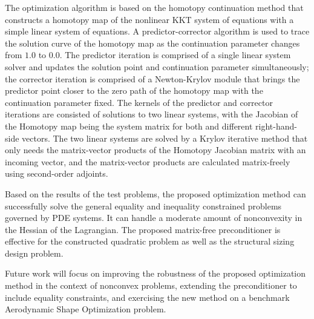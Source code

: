 \documentclass{article}
\theoremstyle{definition}
\begin{document}
The optimization algorithm is based on the homotopy continuation method that constructs a homotopy map of the nonlinear KKT system of equations with a simple linear system of equations. A predictor-corrector algorithm is used to trace the solution curve of the homotopy map as the continuation parameter changes from $1.0$ to $0.0$. The predictor iteration is comprised of a single linear system solver and updates the solution point and continuation parameter simultaneously; the corrector iteration is comprised of a Newton-Krylov module that brings the predictor point closer to the zero path of the homotopy map with the continuation parameter fixed. The kernels of the predictor and corrector iterations are consisted of solutions to two linear systems, with the Jacobian of the Homotopy map being the system matrix for both and different right-hand-side vectors. The two linear systems are solved by a Krylov iterative method that only needs the matrix-vector products of the Homotopy Jacobian matrix with an incoming vector, and the matrix-vector products are calculated matrix-freely using second-order adjoints. 

Based on the results of the test problems, the proposed optimization method can successfully solve the general equality and inequality constrained problems governed by PDE systems. It can handle a moderate amount of nonconvexity in the Hessian of the Lagrangian. The proposed matrix-free preconditioner is effective for the constructed quadratic problem as well as the structural sizing design problem. 

Future work will focus on improving the robustness of the proposed optimization method in the context of nonconvex problems, extending the preconditioner to include equality constraints, and exercising the new method on a benchmark Aerodynamic Shape Optimization problem. 

\newpage


 


\end{document}
